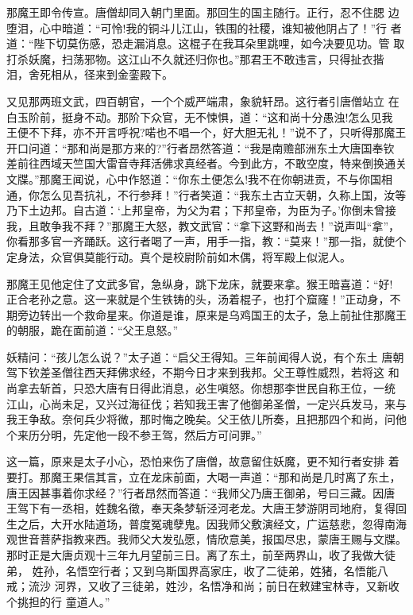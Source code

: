 那魔王即令传宣。唐僧却同入朝门里面。那回生的国主随行。正行，忍不住腮
边堕泪，心中暗道：“可怜!我的铜斗儿江山，铁围的社稷，谁知被他阴占了！”行
者道：“陛下切莫伤感，恐走漏消息。这棍子在我耳朵里跳哩，如今决要见功。管
取打杀妖魔，扫荡邪物。这江山不久就还归你也。”那君王不敢违言，只得扯衣揩
泪，舍死相从，径来到金銮殿下。

又见那两班文武，四百朝官，一个个威严端肃，象貌轩昂。这行者引唐僧站立
在白玉阶前，挺身不动。那阶下众官，无不悚惧，道：“这和尚十分愚浊!怎么见我
王便不下拜，亦不开言呼祝?喏也不唱一个，好大胆无礼！”说不了，只听得那魔王
开口问道：“那和尚是那方来的?”行者昂然答道：“我是南赡部洲东土大唐国奉钦
差前往西域天竺国大雷音寺拜活佛求真经者。今到此方，不敢空度，特来倒换通关
文牒。”那魔王闻说，心中作怒道：“你东土便怎么!我不在你朝进贡，不与你国相
通，你怎么见吾抗礼，不行参拜！”行者笑道：“我东土古立天朝，久称上国，汝等
乃下土边邦。自古道：‘上邦皇帝，为父为君；下邦皇帝，为臣为子。’你倒未曾接
我，且敢争我不拜？”那魔王大怒，教文武官：“拿下这野和尚去！”说声叫“拿”，
你看那多官一齐踊跃。这行者喝了一声，用手一指，教：“莫来！”那一指，就使个
定身法，众官俱莫能行动。真个是校尉阶前如木偶，将军殿上似泥人。

那魔王见他定住了文武多官，急纵身，跳下龙床，就要来拿。猴王暗喜道：“好!
正合老孙之意。这一来就是个生铁铸的头，汤着棍子，也打个窟窿！”正动身，不
期旁边转出一个救命星来。你道是谁，原来是乌鸡国王的太子，急上前扯住那魔王
的朝服，跪在面前道：“父王息怒。”

妖精问：“孩儿怎么说？”太子道：“启父王得知。三年前闻得人说，有个东土
唐朝驾下钦差圣僧往西天拜佛求经，不期今日才来到我邦。父王尊性威烈，若将这
和尚拿去斩首，只恐大唐有日得此消息，必生嗔怒。你想那李世民自称王位，一统
江山，心尚未足，又兴过海征伐；若知我王害了他御弟圣僧，一定兴兵发马，来与
我王争敌。奈何兵少将微，那时悔之晚矣。父王依儿所奏，且把那四个和尚，问他
个来历分明，先定他一段不参王驾，然后方可问罪。”

这一篇，原来是太子小心，恐怕来伤了唐僧，故意留住妖魔，更不知行者安排
着要打。那魔王果信其言，立在龙床前面，大喝一声道：“那和尚是几时离了东土，
唐王因甚事着你求经？”行者昂然而答道：“我师父乃唐王御弟，号曰三藏。因唐
王驾下有一丞相，姓魏名徵，奉天条梦斩泾河老龙。大唐王梦游阴司地府，复得回
生之后，大开水陆道场，普度冤魂孽鬼。因我师父敷演经文，广运慈悲，忽得南海
观世音菩萨指教来西。我师父大发弘愿，情欣意美，报国尽忠，蒙唐王赐与文牒。
那时正是大唐贞观十三年九月望前三日。离了东土，前至两界山，收了我做大徒弟，
姓孙，名悟空行者；又到乌斯国界高家庄，收了二徒弟，姓猪，名悟能八戒；流沙
河界，又收了三徒弟，姓沙，名悟净和尚；前日在敕建宝林寺，又新收个挑担的行
童道人。”

